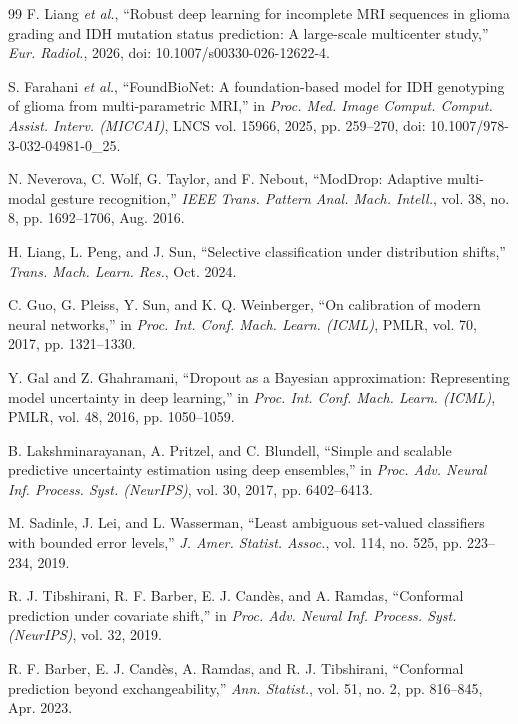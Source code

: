 \documentclass[conference]{IEEEtran}
\begin{document}
\begin{thebibliography}{99}
 F. Liang \emph{et al.}, ``Robust deep learning for incomplete MRI sequences in glioma grading and IDH mutation status prediction: A large-scale multicenter study,'' \emph{Eur. Radiol.}, 2026, doi: 10.1007/s00330-026-12622-4.

 S. Farahani \emph{et al.}, ``FoundBioNet: A foundation-based model for IDH genotyping of glioma from multi-parametric MRI,'' in \emph{Proc. Med. Image Comput. Comput. Assist. Interv. (MICCAI)}, LNCS vol. 15966, 2025, pp. 259--270, doi: 10.1007/978-3-032-04981-0\_25.

 N. Neverova, C. Wolf, G. Taylor, and F. Nebout, ``ModDrop: Adaptive multi-modal gesture recognition,'' \emph{IEEE Trans. Pattern Anal. Mach. Intell.}, vol. 38, no. 8, pp. 1692--1706, Aug. 2016.

 H. Liang, L. Peng, and J. Sun, ``Selective classification under distribution shifts,'' \emph{Trans. Mach. Learn. Res.}, Oct. 2024.

 C. Guo, G. Pleiss, Y. Sun, and K. Q. Weinberger, ``On calibration of modern neural networks,'' in \emph{Proc. Int. Conf. Mach. Learn. (ICML)}, PMLR, vol. 70, 2017, pp. 1321--1330.

 Y. Gal and Z. Ghahramani, ``Dropout as a Bayesian approximation: Representing model uncertainty in deep learning,'' in \emph{Proc. Int. Conf. Mach. Learn. (ICML)}, PMLR, vol. 48, 2016, pp. 1050--1059.

 B. Lakshminarayanan, A. Pritzel, and C. Blundell, ``Simple and scalable predictive uncertainty estimation using deep ensembles,'' in \emph{Proc. Adv. Neural Inf. Process. Syst. (NeurIPS)}, vol. 30, 2017, pp. 6402--6413.

 M. Sadinle, J. Lei, and L. Wasserman, ``Least ambiguous set-valued classifiers with bounded error levels,'' \emph{J. Amer. Statist. Assoc.}, vol. 114, no. 525, pp. 223--234, 2019.

 R. J. Tibshirani, R. F. Barber, E. J. Cand\`{e}s, and A. Ramdas, ``Conformal prediction under covariate shift,'' in \emph{Proc. Adv. Neural Inf. Process. Syst. (NeurIPS)}, vol. 32, 2019.

 R. F. Barber, E. J. Cand\`{e}s, A. Ramdas, and R. J. Tibshirani, ``Conformal prediction beyond exchangeability,'' \emph{Ann. Statist.}, vol. 51, no. 2, pp. 816--845, Apr. 2023.


\end{thebibliography}
\end{document}
